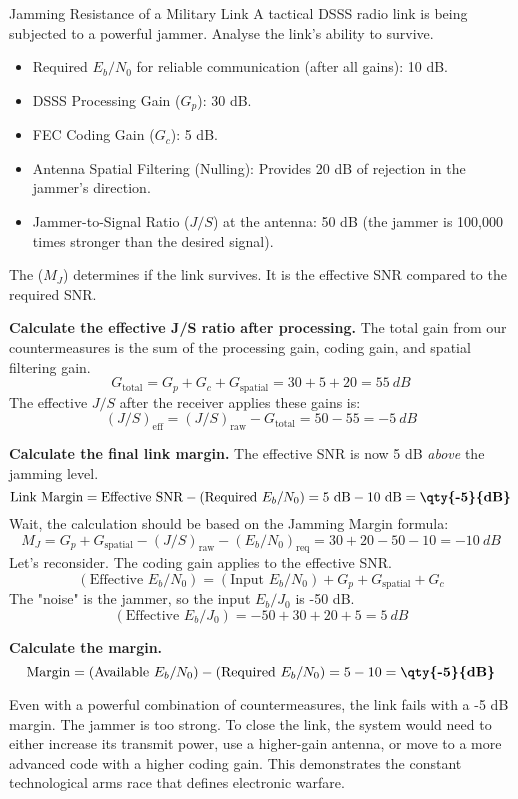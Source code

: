\begin{workedexample}{Jamming Resistance of a Military Link}
     A tactical DSSS radio link is being subjected to a powerful jammer. Analyse the link's ability to survive.
    \begin{itemize}
        \item Required $E_b/N_0$ for reliable communication (after all gains): 10 dB.
        \item DSSS Processing Gain ($G_p$): 30 dB.
        \item FEC Coding Gain ($G_c$): 5 dB.
        \item Antenna Spatial Filtering (Nulling): Provides 20 dB of rejection in the jammer's direction.
        \item Jammer-to-Signal Ratio ($J/S$) at the antenna: 50 dB (the jammer is 100,000 times stronger than the desired signal).
    \end{itemize}
    The  ($M_J$) determines if the link survives. It is the effective SNR compared to the required SNR.
    \begin{derivationsteps}
        \step \textbf{Calculate the effective J/S ratio after processing.} The total gain from our countermeasures is the sum of the processing gain, coding gain, and spatial filtering gain.
        \[ G_{\text{total}} = G_p + G_c + G_{\text{spatial}} = 30 + 5 + 20 = \qty{55}{dB} \]
        The effective $J/S$ after the receiver applies these gains is:
        \[ (J/S)_{\text{eff}} = (J/S)_{\text{raw}} - G_{\text{total}} = 50 - 55 = \qty{-5}{dB} \]
        
        \step \textbf{Calculate the final link margin.} The effective SNR is now 5 dB \emph{above} the jamming level.
        \[ \text{Link Margin} = \text{Effective SNR} - (\text{Required } E_b/N_0) = 5 \text{ dB} - 10 \text{ dB} = \textbf{\qty{-5}{dB}} \]
        Wait, the calculation should be based on the Jamming Margin formula:
        \[ M_J = G_p + G_{\text{spatial}} - (J/S)_{\text{raw}} - (E_b/N_0)_{\text{req}} = 30 + 20 - 50 - 10 = \qty{-10}{dB} \]
        Let's reconsider. The coding gain applies to the effective SNR.
        \[ (\text{Effective } E_b/N_0) = (\text{Input } E_b/N_0) + G_p + G_{\text{spatial}} + G_c \]
        The "noise" is the jammer, so the input $E_b/J_0$ is -50 dB.
        \[ (\text{Effective } E_b/J_0) = -50 + 30 + 20 + 5 = \qty{5}{dB} \]
        
        \step \textbf{Calculate the margin.}
        \[ \text{Margin} = (\text{Available } E_b/N_0) - (\text{Required } E_b/N_0) = 5 - 10 = \textbf{\qty{-5}{dB}} \]
    \end{derivationsteps}
    
     Even with a powerful combination of countermeasures, the link fails with a -5 dB margin. The jammer is too strong. To close the link, the system would need to either increase its transmit power, use a higher-gain antenna, or move to a more advanced code with a higher coding gain. This demonstrates the constant technological arms race that defines electronic warfare.
\end{workedexample}

